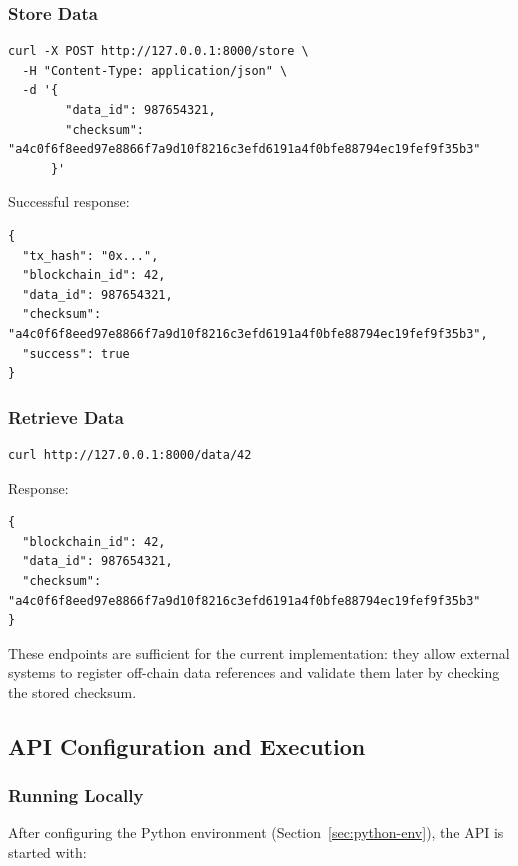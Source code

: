 \documentclass[11pt,a4paper]{article}
\begin{document}
\subsubsection{Store Data}

\begin{lstlisting}
curl -X POST http://127.0.0.1:8000/store \
  -H "Content-Type: application/json" \
  -d '{
        "data_id": 987654321,
        "checksum": "a4c0f6f8eed97e8866f7a9d10f8216c3efd6191a4f0bfe88794ec19fef9f35b3"
      }'
\end{lstlisting}

Successful response:

\begin{lstlisting}
{
  "tx_hash": "0x...",
  "blockchain_id": 42,
  "data_id": 987654321,
  "checksum": "a4c0f6f8eed97e8866f7a9d10f8216c3efd6191a4f0bfe88794ec19fef9f35b3",
  "success": true
}
\end{lstlisting}

\subsubsection{Retrieve Data}

\begin{lstlisting}
curl http://127.0.0.1:8000/data/42
\end{lstlisting}

Response:

\begin{lstlisting}
{
  "blockchain_id": 42,
  "data_id": 987654321,
  "checksum": "a4c0f6f8eed97e8866f7a9d10f8216c3efd6191a4f0bfe88794ec19fef9f35b3"
}
\end{lstlisting}

These endpoints are sufficient for the current implementation: they allow external systems to register off-chain data references and validate them later by checking the stored checksum.

\subsection{API Configuration and Execution}

\subsubsection{Running Locally}

After configuring the Python environment (Section~\ref{sec:python-env}), the API is started with:
\end{document}
